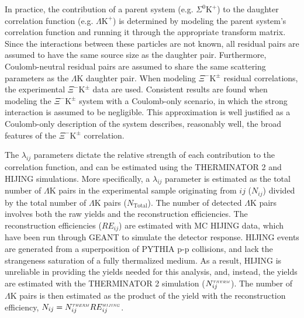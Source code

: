 \documentclass[ALICE,manyauthors]{cernphprep}
\newcommand{\KchP}{$\mathrm{K^{+}}$\xspace}
\newcommand{\LamK}{$\Lambda$K\xspace}
\newcommand{\LamKchP}{$\Lambda\mathrm{K^{+}}$\xspace}
\newcommand{\XiKpm}{$\Xi^{-}\mathrm{K^{\pm}}$\xspace}
\begin{document}
In practice, the contribution of a parent system (e.g. $\Sigma^{0}$\KchP) to the daughter correlation function (e.g. \LamKchP) is determined by modeling the parent system's correlation function and running it through the appropriate transform matrix.
Since the interactions between these particles are not known, all residual pairs are assumed to have the same source size as the daughter pair.
Furthermore, Coulomb-neutral residual pairs are assumed to share the same scattering parameters as the \LamK daughter pair.
When modeling \XiKpm residual correlations, the experimental \XiKpm data are used. 
Consistent results are found when modeling the \XiKpm system with a Coulomb-only scenario, in which the strong interaction is assumed to be negligible.
This approximation is well justified as a Coulomb-only description of the system describes, reasonably well, the broad features of the \XiKpm correlation.   

The $\lambda_{ij}$ parameters dictate the relative strength of each contribution to the correlation function, and can be estimated using the THERMINATOR 2 and HIJING simulations.
More specifically, a $\lambda_{ij}$ parameter is estimated as the total number of \LamK pairs in the experimental sample originating from $ij$ ($N_{ij}$) divided by the total number of \LamK pairs ($N_{\mathrm{Total}}$).
The number of detected \LamK pairs involves both the raw yields and the reconstruction efficiencies.
The reconstruction efficiencies ($RE_{ij}$) are estimated with MC HIJING data, which have been run through GEANT to simulate the detector response.
HIJING events are generated from a superposition of PYTHIA p-p collisions, and lack the strangeness saturation of a fully thermalized medium.
As a result, HIJING is unreliable in providing the yields needed for this analysis, and, instead, the yields are estimated with the THERMINATOR 2 simulation ($N_{ij}^{\scaleto{THERM}{3pt}}$).
The number of \LamK pairs is then estimated as the product of the yield with the reconstruction efficiency, $N_{ij} = N_{ij}^{\scaleto{THERM}{3pt}}RE_{ij}^{\scaleto{HIJING}{3pt}}$.
\end{document}
